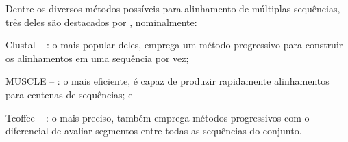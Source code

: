 \documentclass[english,brazilian]{UNISINOSmonografia} %
\begin{document}
%
%
%
%

Dentre os diversos métodos possíveis para alinhamento de múltiplas sequências, três deles são destacados por , nominalmente:
 \begin{inparaenum} 
	\item Clustal -- \cite{Sievers2014}: o mais popular deles, emprega um método progressivo para construir os alinhamentos em uma sequência por vez;
	\item MUSCLE -- \cite{Edgar2004}: o mais eficiente, é capaz de produzir rapidamente alinhamentos para centenas de sequências; e
	\item Tcoffee -- \cite{Notredame2000}: o mais preciso, também emprega métodos progressivos com o diferencial de avaliar segmentos entre todas as sequências do conjunto.
\end{inparaenum}
\end{document}
